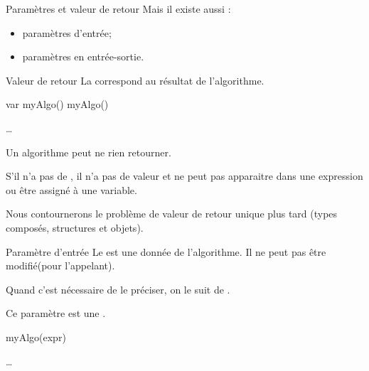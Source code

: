 \begin{hideedit}
\begin{frame}{Paramètres et valeur de retour}
  \pause
  Mais il existe aussi :
  \begin{itemize}
    \item paramètres d'entrée;
    \item paramètres en entrée-sortie.
  \end{itemize}
\end{frame}

\begin{frame}{Valeur de retour}
  La  correspond au résultat de l'algorithme.

  \begin{minipage}{4.5cm}
    \begin{pseudocode}
      \Stmt var \Gets myAlgo()
      \Stmt myAlgo()
    \end{pseudocode}
  \end{minipage}
  \hfill
  \begin{minipage}{6.5cm}
    \begin{pseudocode}
      \Stmt \dots
      \EndAlgo
    \end{pseudocode}
  \end{minipage}

  \pause
  Un algorithme peut ne rien retourner.

  \pause
  S'il n'a pas de \Gives, il n'a pas de valeur et ne peut pas apparaitre dans
  une expression ou être assigné à une variable.

  \pause
  Nous contournerons le problème de valeur de retour unique plus tard
  (types composés, structures et objets).
\end{frame}

\begin{frame}[fragile]{Paramètre d'entrée}
  Le  est une donnée de l'algorithme. Il ne peut
  pas être modifié\pause (pour l'appelant).

  Quand c'est nécessaire de le préciser, on le suit de \In.

  Ce paramètre est une .

  \vfill
  \begin{center}
  \begin{minipage}{4.5cm}
    \begin{pseudocode}
\Stmt myAlgo(expr)
\Empty
    \end{pseudocode}
  \end{minipage}
  \hfill
  \begin{minipage}{7cm}
    \begin{pseudocode}
\Stmt \dots
\EndAlgo
    \end{pseudocode}
  \end{minipage}
  \end{center}


\end{frame}
\end{hideedit}
